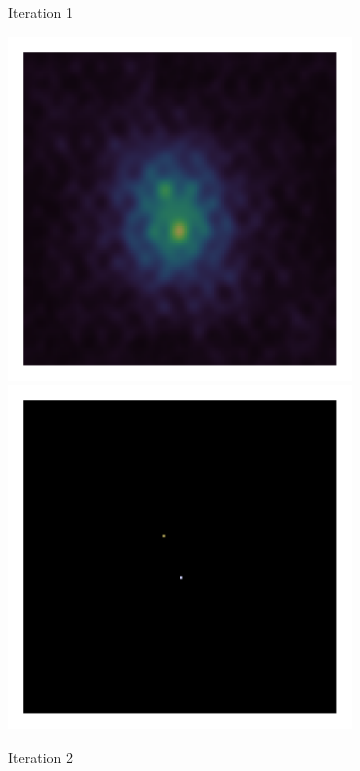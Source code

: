 \begin{figure}[h]
\begin{subfigure}[b]{0.48\linewidth}
\begin{subfigure}[b]{0.48\linewidth}
		\end{subfigure}
		\caption{Iteration 1}
	\end{subfigure}
	\begin{subfigure}[b]{0.48\linewidth}
		\includegraphics[width=0.48\linewidth, clip, trim= 1.0in 1.0in 1.0in 1.0in]{./chapters/01.intro/cleanExample/dirty_CLEAN_2.png}  \includegraphics[width=0.48\linewidth, clip, trim= 1.0in 1.0in 1.0in 1.0in]{./chapters/01.intro/cleanExample/model_CLEAN_2.png} 
		\caption{Iteration 2}
	\end{subfigure}
	\begin{subfigure}[b]{0.48\linewidth}

\end{subfigure}
\end{figure}
